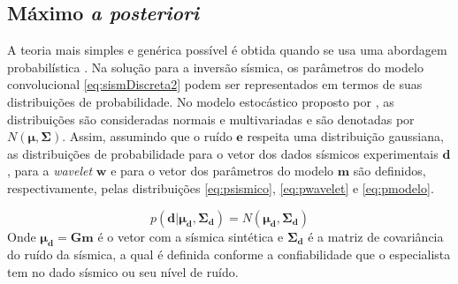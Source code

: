 % 

\subsection{Máximo \textit{a posteriori}}
\label{sec:map}

A teoria mais simples e genérica possível é obtida quando se usa uma
abordagem probabilística \citep{tarantola}. Na solução para a inversão
sísmica, os parâmetros do modelo convolucional \ref{eq:sismDiscreta2}
podem ser representados em termos de suas distribuições de probabilidade.
No modelo estocástico proposto por \cite{Figueiredo2014}, as distribuições
são consideradas normais e multivariadas e são denotadas por $N(\boldsymbol{\mu},\boldsymbol{\Sigma})$.
Assim, assumindo que o ruído $\boldsymbol{e}$ respeita uma distribuição gaussiana,
as distribuições de probabilidade para o vetor dos dados sísmicos experimentais
$\boldsymbol{d}$, para a \textit{wavelet} $\boldsymbol{w}$ e para
o vetor dos parâmetros do modelo $\boldsymbol{m}$ são
definidos, respectivamente, pelas distribuições \ref{eq:psismico}, \ref{eq:pwavelet} e \ref{eq:pmodelo}.

\begin{equation}
\label{eq:psismico}
p(\boldsymbol{d}|\boldsymbol{\mu_{d}},\boldsymbol{\Sigma_{d}}) =
N(\boldsymbol{\mu_{d}},\boldsymbol{\Sigma_{d}})
\end{equation}
Onde $\boldsymbol{\mu_{d}} = \boldsymbol{Gm}$ é o vetor com a sísmica
sintética e $\boldsymbol{\Sigma_{d}}$ é a matriz de covariância do ruído da
sísmica, a qual é definida conforme a confiabilidade que o especialista tem no
dado sísmico ou seu nível de ruído.

